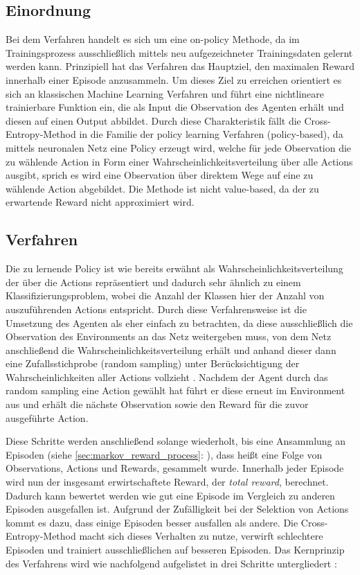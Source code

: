 \documentclass[11pt]{scrartcl}
\begin{document}
\subsection{Einordnung}
Bei dem Verfahren handelt es sich um eine on-policy Methode, da im Trainingsprozess ausschließlich
mittels neu aufgezeichneter Trainingsdaten gelernt werden kann. Prinzipiell hat das Verfahren das
Hauptziel, den maximalen Reward innerhalb einer Episode anzusammeln. Um dieses Ziel zu erreichen
orientiert es sich an klassischen Machine Learning Verfahren und führt eine nichtlineare trainierbare
Funktion ein, die als Input die Observation des Agenten erhält und diesen auf einen Output abbildet.
Durch diese Charakteristik fällt die Cross-Entropy-Method in die Familie der policy learning Verfahren
(policy-based), da mittels neuronalen Netz eine Policy erzeugt wird, welche für jede Observation die
zu wählende Action in Form einer Wahrscheinlichkeitsverteilung über alle Actions ausgibt, sprich es
wird eine Observation über direktem Wege auf eine zu wählende Action abgebildet. Die
Methode ist nicht value-based, da der zu erwartende Reward nicht approximiert wird.

\subsection{Verfahren} %
Die zu lernende Policy ist wie bereits erwähnt als Wahrscheinlichkeitsverteilung der
über die Actions repräsentiert und dadurch sehr ähnlich zu einem Klassifizierungsproblem,
wobei die Anzahl der Klassen hier der Anzahl von auszuführenden Actions entspricht. Durch
diese Verfahrensweise ist die Umsetzung des Agenten als eher einfach zu betrachten, da
diese ausschließlich die Observation des Environments an das Netz weitergeben muss, von
dem Netz anschließend die Wahrscheinlichkeitsverteilung erhält und anhand dieser dann eine
Zufallsstichprobe (random sampling) unter Berücksichtigung der Wahrscheinlichkeiten aller
Actions vollzieht \cite[~S.78]{L2018}. Nachdem der Agent durch das random sampling eine
Action gewählt hat führt er diese erneut im Environment aus und erhält die nächste
Observation sowie den Reward für die zuvor ausgeführte Action.

Diese Schritte werden anschließend solange wiederholt, bis eine Ansammlung an Episoden (siehe 
\autoref{sec:markov_reward_process}: ), dass heißt eine Folge
von Observations, Actions und Rewards, gesammelt wurde. Innerhalb jeder Episode wird nun der
insgesamt erwirtschaftete Reward, der \textit{total reward}, berechnet. Dadurch kann bewertet werden
wie gut eine Episode im Vergleich zu anderen Episoden ausgefallen ist. Aufgrund der Zufälligkeit
bei der Selektion von Actions kommt es dazu, dass einige Episoden besser ausfallen als andere.
Die Cross-Entropy-Method macht sich dieses Verhalten zu nutze, verwirft schlechtere Episoden und
trainiert ausschließlichen auf besseren Episoden. Das Kernprinzip des Verfahrens wird wie nachfolgend
aufgelistet in drei Schritte untergliedert \cite[~S.80 f.]{L2018}:
\end{document}
